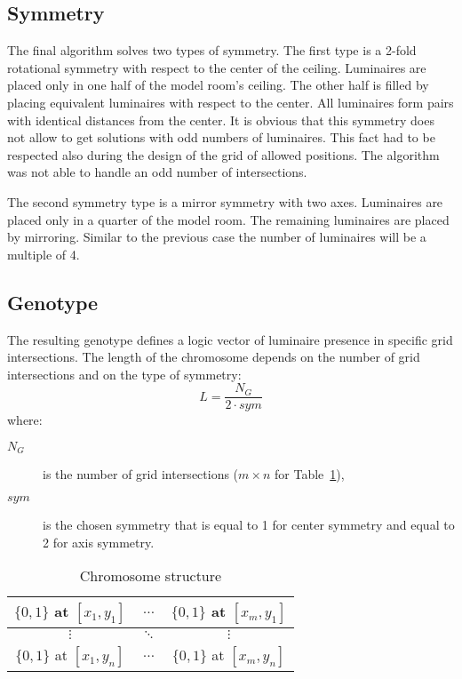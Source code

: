 \subsection{Symmetry}
The final algorithm solves two types of symmetry. The first type is a 2-fold rotational symmetry with respect to the center of the ceiling. Luminaires are placed only in one half of the model room's ceiling. The other half is filled by placing equivalent luminaires with respect to the center. All luminaires form pairs with identical distances from the center. It is obvious that this symmetry does not allow to get solutions with odd numbers of luminaires. This fact had to be respected also during the design of the grid of allowed positions. The algorithm was not able to handle an odd number of intersections.

The second symmetry type is a mirror symmetry with two axes. Luminaires are placed only in a quarter of the model room. The remaining luminaires are placed by mirroring. Similar to the previous case the number of luminaires will be a multiple of 4.

\subsection{Genotype}
The resulting genotype defines a logic vector of luminaire presence in specific grid intersections. The length of the chromosome depends on the number of grid intersections and on the type of symmetry:
\begin{equation}
\label{eq:chromLength}
L = \frac{N_G}{2\cdot sym}
\end{equation}
where:
\begin{description}
	\item[$N_G$] is the number of grid intersections ($m\times n$ for Table~\ref{tab:strucgenotype}),
	\item[$sym$] is the chosen symmetry that is equal to 1 for center symmetry and equal to 2 for axis symmetry.
\end{description}

\begin{table}[b]
	\renewcommand{\arraystretch}{1.3}
	\caption{Chromosome structure}
 	\label{tab:strucgenotype}
	\centering
  \begin{tabular}{| c | c | c |}
    \hline
    $\lbrace0,1\rbrace$ at $[x_1,y_1]$ & $\ldots$ & $\lbrace0,1\rbrace$ at $[x_m,y_1]$ \\
    \hline
    $\vdots$ & $\ddots$ & $\vdots$ \\
    \hline
    $\lbrace0,1\rbrace$ at $[x_1,y_n]$ & $\ldots$ & $\lbrace0,1\rbrace$ at $[x_m,y_n]$ \\
    \hline
  \end{tabular}
\end{table}

